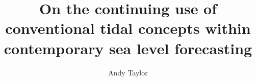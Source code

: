 \title{On the continuing use of conventional tidal concepts within contemporary sea level forecasting}
\author{Andy Taylor}




